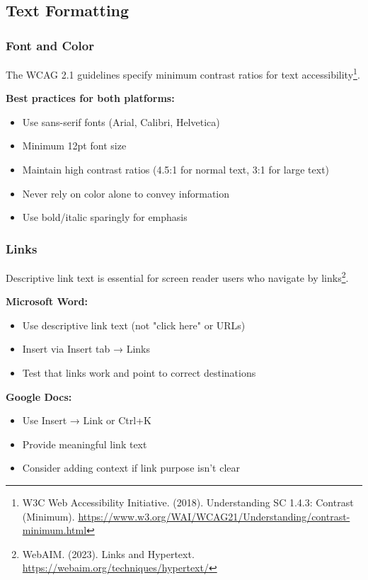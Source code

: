 \subsection{Text Formatting}

\subsubsection{Font and Color}
The WCAG 2.1 guidelines specify minimum contrast ratios for text accessibility\footnote{W3C Web Accessibility Initiative. (2018). Understanding SC 1.4.3: Contrast (Minimum). \url{https://www.w3.org/WAI/WCAG21/Understanding/contrast-minimum.html}}.

\textbf{Best practices for both platforms:}
\begin{itemize}
\item Use sans-serif fonts (Arial, Calibri, Helvetica)
\item Minimum 12pt font size
\item Maintain high contrast ratios (4.5:1 for normal text, 3:1 for large text)
\item Never rely on color alone to convey information
\item Use bold/italic sparingly for emphasis
\end{itemize}

\subsubsection{Links}
Descriptive link text is essential for screen reader users who navigate by links\footnote{WebAIM. (2023). Links and Hypertext. \url{https://webaim.org/techniques/hypertext/}}.

\textbf{Microsoft Word:}
\begin{itemize}
\item Use descriptive link text (not "click here" or URLs)
\item Insert via Insert tab → Links
\item Test that links work and point to correct destinations
\end{itemize}

\textbf{Google Docs:}
\begin{itemize}
\item Use Insert → Link or Ctrl+K
\item Provide meaningful link text
\item Consider adding context if link purpose isn't clear
\end{itemize}

